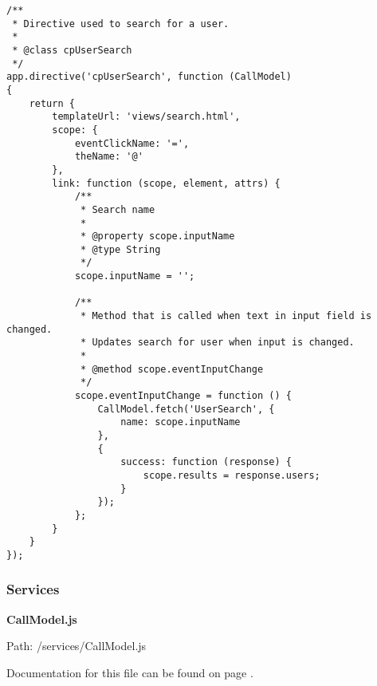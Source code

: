 {\scriptsize
\begin{lstlisting}
/**
 * Directive used to search for a user.
 *
 * @class cpUserSearch
 */
app.directive('cpUserSearch', function (CallModel)
{
	return {
		templateUrl: 'views/search.html',
		scope: {
			eventClickName: '=',
			theName: '@'
		},
		link: function (scope, element, attrs) {
			/**
			 * Search name
			 *
			 * @property scope.inputName
			 * @type String
			 */
			scope.inputName = '';

			/**
			 * Method that is called when text in input field is changed.
			 * Updates search for user when input is changed.
			 *
			 * @method scope.eventInputChange
			 */
			scope.eventInputChange = function () {
				CallModel.fetch('UserSearch', {
					name: scope.inputName
				},
				{
					success: function (response) {
						scope.results = response.users;
					}
				});
			};
		}
	}
});\end{lstlisting}
}
\subsubsection{Services}
\textbf{CallModel.js}\label{CallModel.js}

Path: /services/CallModel.js

Documentation for this file can be found on page \pageref{CallModel.js.doc}.

